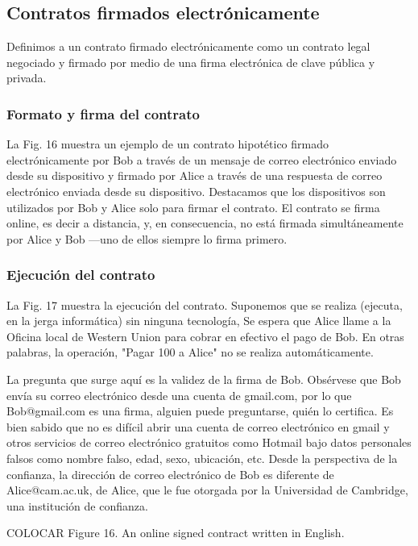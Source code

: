 \documentclass[12pt]{report} %
\begin{document}
\begin{itemize}
\subsection{Contratos firmados electrónicamente}

Definimos a un contrato firmado electrónicamente como un contrato legal negociado y firmado por medio de una firma electrónica de clave pública y privada.

\subsubsection{Formato y firma del contrato}

La Fig. 16 muestra un ejemplo de un contrato hipotético firmado electrónicamente por Bob a través de un mensaje de correo electrónico enviado desde su dispositivo y firmado por Alice a través de una respuesta de correo electrónico enviada desde su dispositivo. Destacamos que los dispositivos son utilizados por Bob y Alice solo para firmar el contrato. El contrato se firma online, es decir a distancia, y, en consecuencia, no está firmada simultáneamente por Alice y Bob —uno de ellos siempre
lo firma primero.

\subsubsection{Ejecución del contrato}

La Fig. 17 muestra la ejecución del contrato. Suponemos que se realiza (ejecuta, en la jerga informática) sin ninguna tecnología, Se espera que Alice llame a la Oficina local de Western Union para cobrar en efectivo el pago de Bob. En otras palabras, la operación, "Pagar 100 a Alice" no se realiza automáticamente.

La pregunta que surge aquí es la validez de la firma de Bob. Obsérvese que Bob envía su correo electrónico desde una cuenta de gmail.com, por lo que Bob@gmail.com es una firma, alguien puede preguntarse, quién lo certifica. Es bien sabido que no es difícil abrir una cuenta de correo electrónico en gmail y otros servicios de correo electrónico gratuitos como Hotmail bajo datos personales falsos como nombre falso, edad, sexo, ubicación, etc. Desde la perspectiva de la confianza, la dirección de correo electrónico de Bob es diferente de Alice@cam.ac.uk, de Alice, que le fue otorgada por la Universidad de Cambridge, una institución de confianza.

COLOCAR Figure 16. An online signed contract written in English.


\end{itemize}
\end{document}
